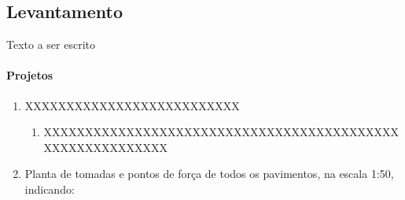\subsection{Levantamento} \label{subsection: etapa-LV}

Texto a ser escrito

\paragraph{Projetos}
	\begin{enumerate}

		\item XXXXXXXXXXXXXXXXXXXXXXXXXX
			\begin{enumerate}
				
				\item XXXXXXXXXXXXXXXXXXXXXXXXXXXXXXXXXXXXXXXXXXXXXXXXXXXXXXXXXX
			
			\end{enumerate}
		
		\item Planta de tomadas e pontos de força de todos os pavimentos, na escala 1:50, indicando:
	\end{enumerate}

